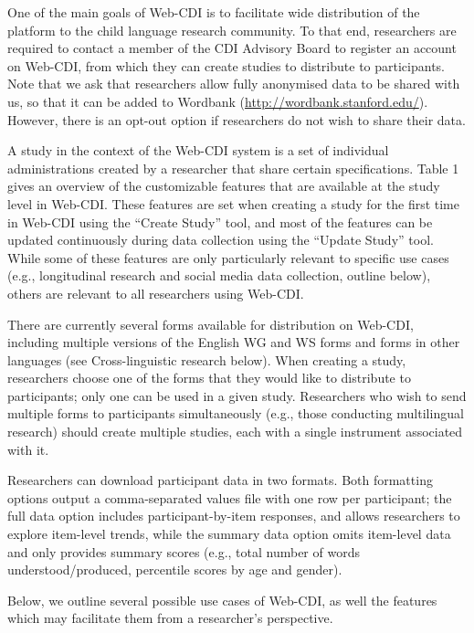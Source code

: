 \documentclass[
  english,
  man]{apa7}
\begin{document}
One of the main goals of Web-CDI is to facilitate wide distribution of the platform to the child language research community. To that end, researchers are required to contact a member of the CDI Advisory Board to register an account on Web-CDI, from which they can create studies to distribute to participants. Note that we ask that researchers allow fully anonymised data to be shared with us, so that it can be added to Wordbank (\url{http://wordbank.stanford.edu/}). However, there is an opt-out option if researchers do not wish to share their data.

A study in the context of the Web-CDI system is a set of individual administrations created by a researcher that share certain specifications. Table 1 gives an overview of the customizable features that are available at the study level in Web-CDI. These features are set when creating a study for the first time in Web-CDI using the \enquote{Create Study} tool, and most of the features can be updated continuously during data collection using the \enquote{Update Study} tool. While some of these features are only particularly relevant to specific use cases (e.g., longitudinal research and social media data collection, outline below), others are relevant to all researchers using Web-CDI.

There are currently several forms available for distribution on Web-CDI, including multiple versions of the English WG and WS forms and forms in other languages (see Cross-linguistic research below). When creating a study, researchers choose one of the forms that they would like to distribute to participants; only one can be used in a given study. Researchers who wish to send multiple forms to participants simultaneously (e.g., those conducting multilingual research) should create multiple studies, each with a single instrument associated with it.

Researchers can download participant data in two formats. Both formatting options output a comma-separated values file with one row per participant; the full data option includes participant-by-item responses, and allows researchers to explore item-level trends, while the summary data option omits item-level data and only provides summary scores (e.g., total number of words understood/produced, percentile scores by age and gender).

Below, we outline several possible use cases of Web-CDI, as well the features which may facilitate them from a researcher's perspective.
\end{document}
